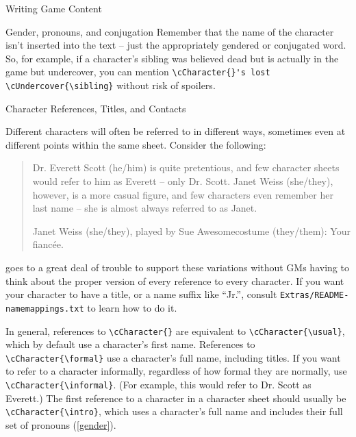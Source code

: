 \documentclass[sheet]{GameTexBase}
\begin{document}
\begin{section}{Writing Game Content}
\begin{subsection}{Gender, pronouns, and conjugation}
Remember that the name of the character isn't inserted into the text – just the appropriately gendered or conjugated word.  So, for example, if a character's sibling was believed dead but is actually in the game but undercover, you can mention \lstinline|\cCharacter{}'s lost \cUndercover{\sibling}| without risk of spoilers.

\end{subsection}
\begin{subsection}{Character References, Titles, and Contacts}
\label{charintro}
\label{charcontacts}

Different characters will often be referred to in different ways, sometimes even at different points within the same sheet.  Consider the following:

\begin{quote}
Dr. Everett Scott (he/him) is quite pretentious, and few character sheets would refer to him as Everett -- only Dr. Scott.  Janet Weiss (she/they), however, is a more casual figure, and few characters even remember her last name -- she is almost always referred to as Janet.

\begin{itemz}[Contacts]
\item Janet Weiss (she/they), played by Sue Awesomecostume (they/them): Your fianc\'ee.
\end{itemz}
\end{quote}

\gametex{} goes to a great deal of trouble to support these variations without GMs having to think about the proper version of every reference to every character.  If you want your character to have a title, or a name suffix like ``Jr.'', consult \texttt{Extras/README-namemappings.txt} to learn how to do it.

In general, references to \lstinline|\cCharacter{}| are equivalent to \lstinline|\cCharacter{\usual}|, which by default use a character's first name.  References to \lstinline|\cCharacter{\formal}| use a character's full name, including titles.  If you want to refer to a character informally, regardless of how formal they are normally, use \lstinline|\cCharacter{\informal}|.  (For example, this would refer to Dr. Scott as Everett.)
The first reference to a character in a character sheet should usually be \lstinline|\cCharacter{\intro}|, which uses a character's full name and includes their full set of pronouns (\ref{gender}).


\end{subsection}
\end{section}
\end{document}

